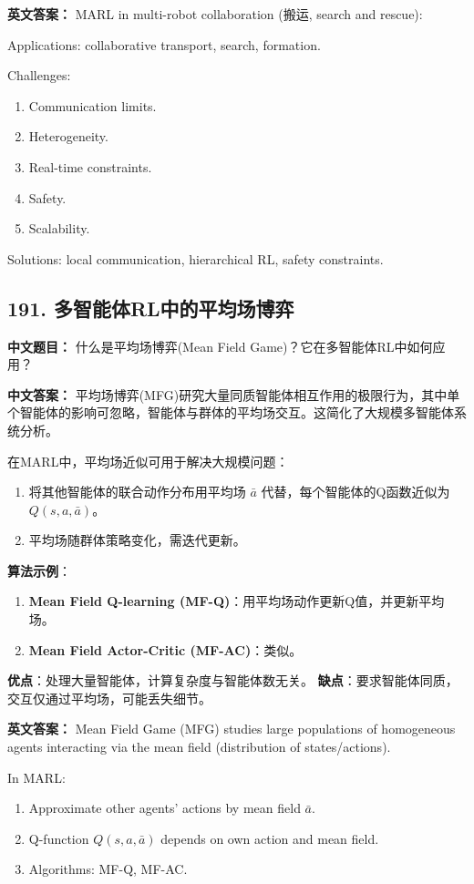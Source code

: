 \documentclass[10pt,a4paper]{ctexart}
\begin{document}
\textbf{英文答案：}  
MARL in multi-robot collaboration (搬运, search and rescue):

Applications: collaborative transport, search, formation.

Challenges:
\begin{enumerate}
    \item Communication limits.
    \item Heterogeneity.
    \item Real-time constraints.
    \item Safety.
    \item Scalability.
\end{enumerate}

Solutions: local communication, hierarchical RL, safety constraints.

\subsection*{191. 多智能体RL中的平均场博弈}
\textbf{中文题目：} 什么是平均场博弈(Mean Field Game)？它在多智能体RL中如何应用？

\textbf{中文答案：}  
平均场博弈(MFG)研究大量同质智能体相互作用的极限行为，其中单个智能体的影响可忽略，智能体与群体的平均场交互。这简化了大规模多智能体系统分析。

在MARL中，平均场近似可用于解决大规模问题：
\begin{enumerate}
    \item 将其他智能体的联合动作分布用平均场 $ \bar{a} $ 代替，每个智能体的Q函数近似为 $ Q(s, a, \bar{a}) $。
    \item 平均场随群体策略变化，需迭代更新。
\end{enumerate}

\textbf{算法示例}：
\begin{enumerate}
    \item \textbf{Mean Field Q-learning (MF-Q)}：用平均场动作更新Q值，并更新平均场。
    \item \textbf{Mean Field Actor-Critic (MF-AC)}：类似。
\end{enumerate}

\textbf{优点}：处理大量智能体，计算复杂度与智能体数无关。
\textbf{缺点}：要求智能体同质，交互仅通过平均场，可能丢失细节。

\textbf{英文答案：}  
Mean Field Game (MFG) studies large populations of homogeneous agents interacting via the mean field (distribution of states/actions).

In MARL:
\begin{enumerate}
    \item Approximate other agents' actions by mean field $\bar{a}$.
    \item Q-function $Q(s, a, \bar{a})$ depends on own action and mean field.
    \item Algorithms: MF-Q, MF-AC.
\end{enumerate}
\end{document}
